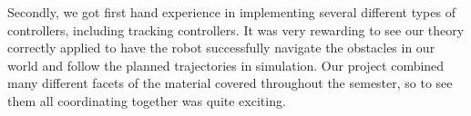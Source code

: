 Secondly, we got first hand experience in implementing several different types of controllers, including tracking controllers.
It was very rewarding to see our theory correctly applied to have the robot successfully navigate the obstacles in our world and follow the planned trajectories in simulation.
Our project combined many different facets of the material covered throughout the semester, so to see them all coordinating together was quite exciting.

